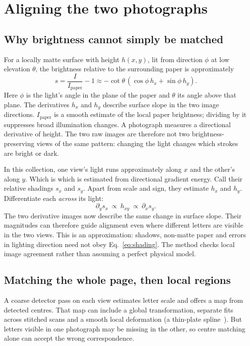 \documentclass[11pt]{article}
\begin{document}
\section{Aligning the two photographs}
\label{sec:registration}
\subsection{Why brightness cannot simply be matched}
For a locally matte surface with height $h(x,y)$, lit from direction $\phi$ at low elevation $\theta$, the
brightness relative to the surrounding paper is approximately
\begin{equation}
 s=\frac{I}{I_{\mathrm{paper}}}-1
   \approx-\cot\theta\,(\cos\phi\,h_x+\sin\phi\,h_y).
 \label{eq:shading}
\end{equation}
Here $\phi$ is the light's angle in the plane of the paper and $\theta$ its angle above that plane.
The derivatives $h_x$ and $h_y$ describe surface slope in the two image directions.
$I_{\mathrm{paper}}$ is a smooth estimate of the local paper brightness; dividing by it suppresses
broad illumination changes. A photograph measures a directional derivative of height. The two raw images
are therefore not two brightness-preserving views of the same pattern: changing the light changes which
strokes are bright or dark.

In this collection, one view's light runs approximately along $x$ and the other's along $y$. Which is which
is estimated from directional gradient energy. Call their relative shadings $s_x$ and $s_y$. Apart from
scale and sign, they estimate $h_x$ and $h_y$. Differentiate each \emph{across} its light:
\begin{equation}
 \partial_y s_x\ \propto\ h_{xy}\ \propto\ \partial_x s_y.
 \label{eq:mixed}
\end{equation}
The two derivative images now describe the same change in surface slope. Their magnitudes can therefore
guide alignment even where different letters are visible in the two views. This is an approximation:
shadows, non-matte paper and errors in lighting direction need not obey Eq.~\eqref{eq:shading}. The method
checks local image agreement rather than assuming a perfect physical model.

\subsection{Matching the whole page, then local regions}
A coarse detector pass on each view estimates letter scale and offers a map from detected centres. That
map can include a global transformation, separate fits across stitched scans and a smooth local
deformation (a thin-plate spline~\cite{bookstein1989}). But letters visible in one photograph may be missing in the other, so centre
matching alone can accept the wrong correspondence.
\end{document}
